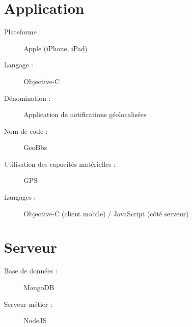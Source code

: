 \documentclass[a4paper,12pt]{report}
\begin{document}
\begin{onehalfspace}
	\section*{Application}
	
	\begin{description}
	\item[Plateforme :] Apple (iPhone, iPad)
	\item[Langage :] Objective-C
	\item[Dénomination :] Application de notifications géolocalisées
	\item[Nom de code :] GeoBbs
	\item[Utilisation des capacités matérielles :] GPS
	\item[Langages :] Objective-C (client mobile) / JavaScript (côté serveur)
	\end{description}

	\section*{Serveur}

	\begin{description}
	\item[Base de données :] MongoDB
	\item[Serveur métier :] NodeJS
	\end{description}

	\newpage

	\end{onehalfspace}
\end{document}
